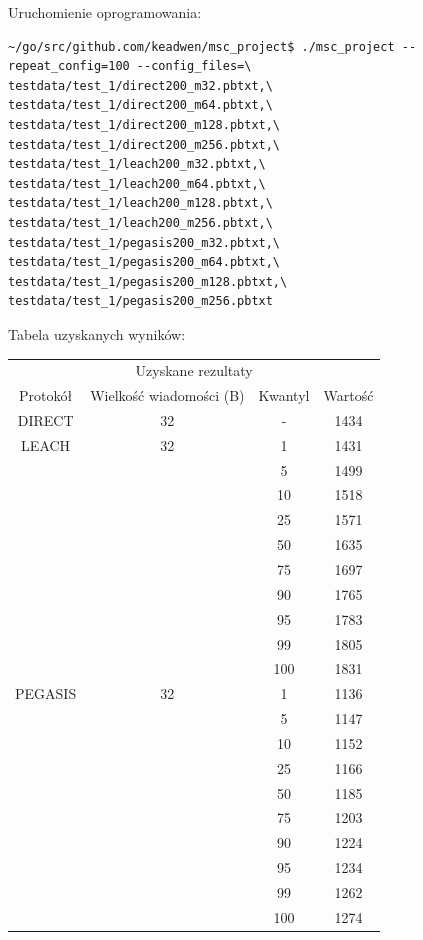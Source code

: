 \documentclass[a4paper,12pt,twoside,openany]{report}
\begin{document}
Uruchomienie oprogramowania:

\begin{lstlisting}
~/go/src/github.com/keadwen/msc_project$ ./msc_project --repeat_config=100 --config_files=\
testdata/test_1/direct200_m32.pbtxt,\
testdata/test_1/direct200_m64.pbtxt,\
testdata/test_1/direct200_m128.pbtxt,\
testdata/test_1/direct200_m256.pbtxt,\
testdata/test_1/leach200_m32.pbtxt,\
testdata/test_1/leach200_m64.pbtxt,\
testdata/test_1/leach200_m128.pbtxt,\
testdata/test_1/leach200_m256.pbtxt,\
testdata/test_1/pegasis200_m32.pbtxt,\
testdata/test_1/pegasis200_m64.pbtxt,\
testdata/test_1/pegasis200_m128.pbtxt,\
testdata/test_1/pegasis200_m256.pbtxt
\end{lstlisting}

Tabela uzyskanych wyników:

\begin{longtable}{*{4}{c}}
\toprule
\multicolumn{4}{c}{Uzyskane rezultaty} \\
Protokół	& Wielkość wiadomości (B)	& Kwantyl	& Wartość \\
\midrule
\endhead
DIRECT	& 32 	& -	& 1434 \\*
\midrule
LEACH	& 32	& 1	& 1431 \\*
	&	& 5	& 1499 \\*
	&	& 10	& 1518 \\*
	&	& 25	& 1571 \\*
	&	& 50	& 1635 \\*
	&	& 75	& 1697 \\*
	&	& 90	& 1765 \\*
	&	& 95	& 1783 \\*
	&	& 99	& 1805 \\*
	&	& 100	& 1831 \\*
\midrule
PEGASIS	& 32	& 1	& 1136 \\*
	&	& 5	& 1147 \\*
	&	& 10	& 1152 \\*
	&	& 25	& 1166 \\*
	&	& 50	& 1185 \\*
	&	& 75	& 1203 \\*
	&	& 90	& 1224 \\*
	&	& 95	& 1234 \\*
	&	& 99	& 1262 \\*
	&	& 100	& 1274 \\*
\bottomrule
\end{longtable}
\end{document}
